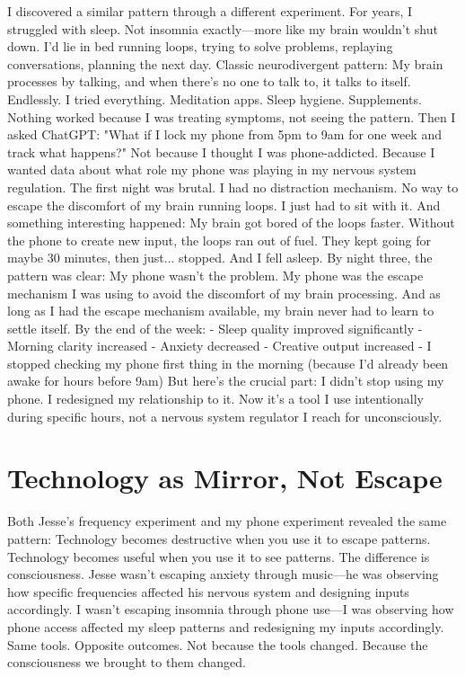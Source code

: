 I discovered a similar pattern through a different experiment.
For years, I struggled with sleep. Not insomnia exactly—more like my brain wouldn't shut down. I'd lie in bed running loops, trying to solve problems, replaying conversations, planning the next day.
Classic neurodivergent pattern: My brain processes by talking, and when there's no one to talk to, it talks to itself. Endlessly.
I tried everything. Meditation apps. Sleep hygiene. Supplements. Nothing worked because I was treating symptoms, not seeing the pattern.
Then I asked ChatGPT: "What if I lock my phone from 5pm to 9am for one week and track what happens?"
Not because I thought I was phone-addicted. Because I wanted data about what role my phone was playing in my nervous system regulation.
The first night was brutal.
I had no distraction mechanism. No way to escape the discomfort of my brain running loops. I just had to sit with it.
And something interesting happened: My brain got bored of the loops faster.
Without the phone to create new input, the loops ran out of fuel. They kept going for maybe 30 minutes, then just... stopped. And I fell asleep.
By night three, the pattern was clear:
My phone wasn't the problem. My phone was the escape mechanism I was using to avoid the discomfort of my brain processing. And as long as I had the escape mechanism available, my brain never had to learn to settle itself.
By the end of the week:
- Sleep quality improved significantly
- Morning clarity increased
- Anxiety decreased
- Creative output increased
- I stopped checking my phone first thing in the morning (because I'd already been awake for hours before 9am)
But here's the crucial part:
I didn't stop using my phone. I redesigned my relationship to it. Now it's a tool I use intentionally during specific hours, not a nervous system regulator I reach for unconsciously.

\section{Technology as Mirror, Not Escape}

Both Jesse's frequency experiment and my phone experiment revealed the same pattern:
Technology becomes destructive when you use it to escape patterns. Technology becomes useful when you use it to see patterns.
The difference is consciousness.
Jesse wasn't escaping anxiety through music—he was observing how specific frequencies affected his nervous system and designing inputs accordingly.
I wasn't escaping insomnia through phone use—I was observing how phone access affected my sleep patterns and redesigning my inputs accordingly.
Same tools. Opposite outcomes.
Not because the tools changed. Because the consciousness we brought to them changed.

